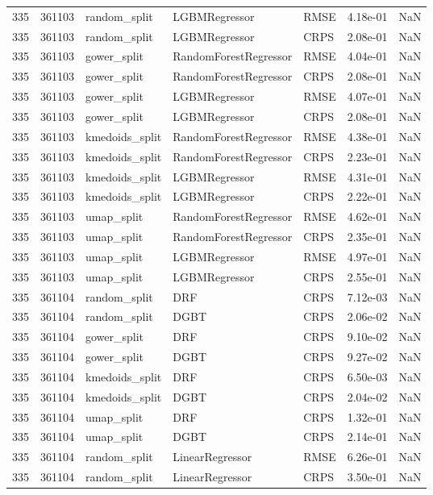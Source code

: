\begin{tabular}{rrlllrr}
335 & 361103 & random\_split & LGBMRegressor & RMSE & 4.18e-01 & NaN \\
335 & 361103 & random\_split & LGBMRegressor & CRPS & 2.08e-01 & NaN \\
335 & 361103 & gower\_split & RandomForestRegressor & RMSE & 4.04e-01 & NaN \\
335 & 361103 & gower\_split & RandomForestRegressor & CRPS & 2.08e-01 & NaN \\
335 & 361103 & gower\_split & LGBMRegressor & RMSE & 4.07e-01 & NaN \\
335 & 361103 & gower\_split & LGBMRegressor & CRPS & 2.08e-01 & NaN \\
335 & 361103 & kmedoids\_split & RandomForestRegressor & RMSE & 4.38e-01 & NaN \\
335 & 361103 & kmedoids\_split & RandomForestRegressor & CRPS & 2.23e-01 & NaN \\
335 & 361103 & kmedoids\_split & LGBMRegressor & RMSE & 4.31e-01 & NaN \\
335 & 361103 & kmedoids\_split & LGBMRegressor & CRPS & 2.22e-01 & NaN \\
335 & 361103 & umap\_split & RandomForestRegressor & RMSE & 4.62e-01 & NaN \\
335 & 361103 & umap\_split & RandomForestRegressor & CRPS & 2.35e-01 & NaN \\
335 & 361103 & umap\_split & LGBMRegressor & RMSE & 4.97e-01 & NaN \\
335 & 361103 & umap\_split & LGBMRegressor & CRPS & 2.55e-01 & NaN \\
335 & 361104 & random\_split & DRF & CRPS & 7.12e-03 & NaN \\
335 & 361104 & random\_split & DGBT & CRPS & 2.06e-02 & NaN \\
335 & 361104 & gower\_split & DRF & CRPS & 9.10e-02 & NaN \\
335 & 361104 & gower\_split & DGBT & CRPS & 9.27e-02 & NaN \\
335 & 361104 & kmedoids\_split & DRF & CRPS & 6.50e-03 & NaN \\
335 & 361104 & kmedoids\_split & DGBT & CRPS & 2.04e-02 & NaN \\
335 & 361104 & umap\_split & DRF & CRPS & 1.32e-01 & NaN \\
335 & 361104 & umap\_split & DGBT & CRPS & 2.14e-01 & NaN \\
335 & 361104 & random\_split & LinearRegressor & RMSE & 6.26e-01 & NaN \\
335 & 361104 & random\_split & LinearRegressor & CRPS & 3.50e-01 & NaN \\

\end{tabular}
